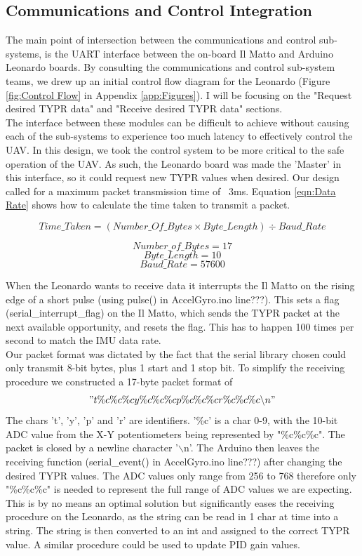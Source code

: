 \documentclass[a4paper,11pt]{article}
\begin{document}
\subsection{Communications and Control Integration}
The main point of intersection between the communications and control sub-systems, is the UART interface between the on-board Il Matto and Arduino Leonardo boards. By consulting the communications and control sub-system teams, we drew up an initial control flow diagram for the Leonardo (Figure \ref{fig:Control Flow} in Appendix \ref{app:Figures}). I will be focusing on the "Request desired TYPR data" and "Receive desired TYPR data" sections.\\ 
The interface between these modules can be difficult to achieve without causing each of the sub-systems to experience too much latency to effectively control the UAV. In this design, we took the control system to be more critical to the safe operation of the UAV. As such, the Leonardo board was made the 'Master' in this interface, so it could request new TYPR values when desired. Our design called for a maximum packet transmission time of ~3ms. Equation \ref{eqn:Data Rate} shows how to calculate the time taken to transmit a packet. 

\begin{equation}
Time\_Taken = (Number\_Of\_Bytes \times Byte\_Length) \div Baud\_Rate
\label{eqn:Data Rate}
\end{equation} 

\[Number\_of\_Bytes = 17\]
\[Byte\_Length = 10\]
\[Baud\_Rate = 57600\]

 When the Leonardo wants to receive data it interrupts the Il Matto on the rising edge of a short pulse (using pulse() in AccelGyro.ino line???). This sets a flag (serial\_interrupt\_flag) on the Il Matto, which sends the TYPR packet at the next available opportunity, and resets the flag. This has to happen 100 times per second to match the IMU data rate.\\
Our packet format was dictated by the fact that the serial library chosen could only transmit 8-bit bytes, plus 1 start and 1 stop bit. To simplify the receiving procedure we constructed a 17-byte packet format of \["t\%c\%c\%cy\%c\%c\%cp\%c\%c\%cr\%c\%c\%c\backslash n"\]
The chars 't', 'y', 'p' and 'r' are identifiers. '\%c' is a char 0-9, with the 10-bit ADC value from the X-Y potentiometers being represented by "\%c\%c\%c". The packet is closed by a newline character '$\backslash$n'. The Arduino then leaves the receiving function (serial\_event() in AccelGyro.ino line???) after changing the desired TYPR values. The ADC values only range from 256 to 768 therefore only "\%c\%c\%c" is needed to represent the full range of ADC values we are expecting. This is by no means an optimal solution but significantly eases the receiving procedure on the Leonardo, as the string can be read in 1 char at time into a string. The string is then converted to an int and assigned to the correct TYPR value. A similar procedure could be used to update PID gain values.  
\end{document}
